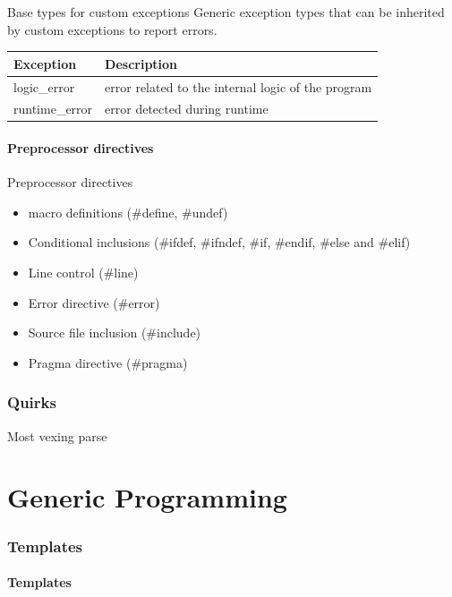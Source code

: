 \documentclass{beamer}
\begin{document}
\begin{frame}{Base types for custom exceptions}
Generic exception types that can be inherited by custom exceptions to report
errors.
\begin{table}
\begin{tabular}{l | l }
Exception & Description \\
\hline
logic\_error & error related to the internal logic of the program \\
runtime\_error & error detected during runtime
\end{tabular}
\end{table}
\end{frame}

\subsection{Preprocessor directives}
\begin{frame}{Preprocessor directives}
\begin{itemize}
  \item macro definitions (\#define, \#undef)
  \item Conditional inclusions (\#ifdef, \#ifndef, \#if, \#endif, \#else and \#elif)
  \item Line control (\#line)
  \item Error directive (\#error)
  \item Source file inclusion (\#include)
  \item Pragma directive (\#pragma)
\end{itemize}
\end{frame}

\section{Quirks}

\begin{frame}{Most vexing parse}
\end{frame}


\part{Generic Programming}

\section{Templates}
\subsection{Templates}
\end{document}
